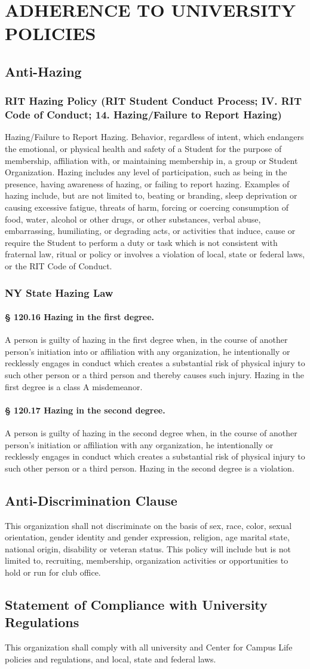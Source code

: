 \documentclass{article}
\newcommand{\article}[1]{\section{#1} \label{#1}}
\newcommand{\asection}[1]{\subsection{#1} \label{#1}}
\newcommand{\asubsection}[1]{\subsubsection{#1} \label{#1}}
\newcommand{\asubsubsection}[1]{\paragraph{#1} \label{#1}}
\begin{document}
\article{ADHERENCE TO UNIVERSITY POLICIES}

\asection{Anti-Hazing}

\asubsection{RIT Hazing Policy (RIT Student Conduct Process; IV. RIT Code of Conduct; 14. Hazing/Failure to Report Hazing)}
Hazing/Failure to Report Hazing.
Behavior, regardless of intent, which endangers the emotional, or physical health and safety of a Student for the purpose of membership, affiliation with, or maintaining membership in, a group or Student Organization.
Hazing includes any level of participation, such as being in the presence, having awareness of hazing, or failing to report hazing.
Examples of hazing include, but are not limited to, beating or branding, sleep deprivation or causing excessive fatigue, threats of harm, forcing or coercing consumption of food, water, alcohol or other drugs, or other substances, verbal abuse, embarrassing, humiliating, or degrading acts, or activities that induce, cause or require the Student to perform a duty or task which is not consistent with fraternal law, ritual or policy or involves a violation of local, state or federal laws, or the RIT Code of Conduct.

\asubsection{NY State Hazing Law}

\asubsubsection{§ 120.16 Hazing in the first degree.}
A person is guilty of hazing in the first degree when, in the course of another person's initiation into or affiliation with any organization, he intentionally or recklessly engages in conduct which creates a substantial risk of physical injury to such other person or a third person and thereby causes such injury.
Hazing in the first degree is a class A misdemeanor.

\asubsubsection{§ 120.17 Hazing in the second degree.}
A person is guilty of hazing in the second degree when, in the course of another person's initiation or affiliation with any organization, he intentionally or recklessly engages in conduct which creates a substantial risk of physical injury to such other person or a third person.
Hazing in the second degree is a violation.

\asection{Anti-Discrimination Clause}
This organization shall not discriminate on the basis of sex, race, color, sexual orientation, gender identity and gender expression, religion, age marital state, national origin, disability or veteran status.
This policy will include but is not limited to, recruiting, membership, organization activities or opportunities to hold or run for club office.

\asection{Statement of Compliance with University Regulations}
This organization shall comply with all university and Center for Campus Life policies and regulations, and local, state and federal laws.
\end{document}
